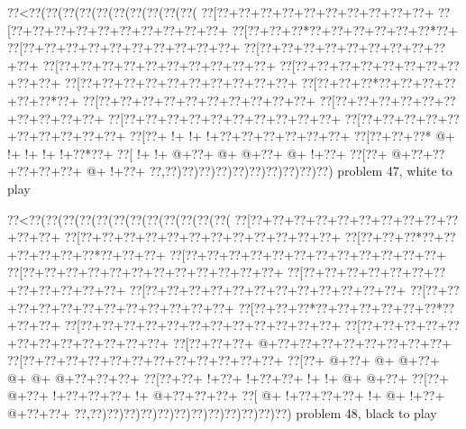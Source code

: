 \vbox{\vbox{\goo
\0??<\0??(\0??(\0??(\0??(\0??(\0??(\0??(\0??(\0??(\0??(
\0??[\0??+\0??+\0??+\0??+\0??+\0??+\0??+\0??+\0??+\0??+
\0??[\0??+\0??+\0??+\0??+\0??+\0??+\0??+\0??+\0??+\0??+
\0??[\0??+\0??+\0??*\0??+\0??+\0??+\0??+\0??+\0??*\0??+
\0??[\0??+\0??+\0??+\0??+\0??+\0??+\0??+\0??+\0??+\0??+
\0??[\0??+\0??+\0??+\0??+\0??+\0??+\0??+\0??+\0??+\0??+
\0??[\0??+\0??+\0??+\0??+\0??+\0??+\0??+\0??+\0??+\0??+
\0??[\0??+\0??+\0??+\0??+\0??+\0??+\0??+\0??+\0??+\0??+
\0??[\0??+\0??+\0??+\0??+\0??+\0??+\0??+\0??+\0??+\0??+
\0??[\0??+\0??+\0??*\0??+\0??+\0??+\0??+\0??+\0??*\0??+
\0??[\0??+\0??+\0??+\0??+\0??+\0??+\0??+\0??+\0??+\0??+
\0??[\0??+\0??+\0??+\0??+\0??+\0??+\0??+\0??+\0??+\0??+
\0??[\0??+\0??+\0??+\0??+\0??+\0??+\0??+\0??+\0??+\0??+
\0??[\0??+\0??+\0??+\0??+\0??+\0??+\0??+\0??+\0??+\0??+
\0??[\0??+\- !+\- !+\- !+\0??+\0??+\0??+\0??+\0??+\0??+
\0??[\0??+\0??+\0??*\- @+\- !+\- !+\- !+\- !+\0??*\0??+
\0??[\- !+\- !+\- @+\0??+\- @+\- @+\0??+\- @+\- !+\0??+
\0??[\0??+\- @+\0??+\0??+\0??+\0??+\0??+\- @+\- !+\0??+
\0??,\0??)\0??)\0??)\0??)\0??)\0??)\0??)\0??)\0??)\0??)
}
\hfil problem 47, white to play\hfil\break
}

\vbox{\vbox{\goo
\0??<\0??(\0??(\0??(\0??(\0??(\0??(\0??(\0??(\0??(\0??(\0??(\0??(
\0??[\0??+\0??+\0??+\0??+\0??+\0??+\0??+\0??+\0??+\0??+\0??+\0??+
\0??[\0??+\0??+\0??+\0??+\0??+\0??+\0??+\0??+\0??+\0??+\0??+\0??+
\0??[\0??+\0??+\0??*\0??+\0??+\0??+\0??+\0??+\0??*\0??+\0??+\0??+
\0??[\0??+\0??+\0??+\0??+\0??+\0??+\0??+\0??+\0??+\0??+\0??+\0??+
\0??[\0??+\0??+\0??+\0??+\0??+\0??+\0??+\0??+\0??+\0??+\0??+\0??+
\0??[\0??+\0??+\0??+\0??+\0??+\0??+\0??+\0??+\0??+\0??+\0??+\0??+
\0??[\0??+\0??+\0??+\0??+\0??+\0??+\0??+\0??+\0??+\0??+\0??+\0??+
\0??[\0??+\0??+\0??+\0??+\0??+\0??+\0??+\0??+\0??+\0??+\0??+\0??+
\0??[\0??+\0??+\0??*\0??+\0??+\0??+\0??+\0??+\0??*\0??+\0??+\0??+
\0??[\0??+\0??+\0??+\0??+\0??+\0??+\0??+\0??+\0??+\0??+\0??+\0??+
\0??[\0??+\0??+\0??+\0??+\0??+\0??+\0??+\0??+\0??+\0??+\0??+\0??+
\0??[\0??+\0??+\0??+\- @+\0??+\0??+\0??+\0??+\0??+\0??+\0??+\0??+
\0??[\0??+\0??+\0??+\0??+\0??+\0??+\0??+\0??+\0??+\0??+\0??+\0??+
\0??[\0??+\- @+\0??+\- @+\- @+\0??+\- @+\- @+\- @+\0??+\0??+\0??+
\0??[\0??+\0??+\- !+\0??+\- !+\0??+\0??+\- !+\- !+\- @+\- @+\0??+
\0??[\0??+\- @+\0??+\- !+\0??+\0??+\0??+\- !+\- @+\0??+\0??+\0??+
\0??[\- @+\- !+\0??+\0??+\0??+\- !+\- @+\- !+\0??+\- @+\0??+\0??+
\0??,\0??)\0??)\0??)\0??)\0??)\0??)\0??)\0??)\0??)\0??)\0??)\0??)
}
\hfil problem 48, black to play\hfil\break
}

